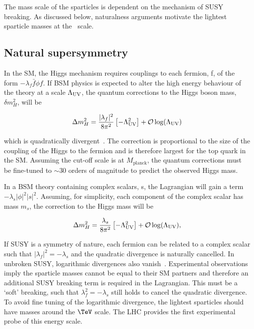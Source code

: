 The mass scale of the sparticles is dependent on the mechanism of SUSY breaking.
As discussed below, naturalness arguments motivate the lightest sparticle masses 
at the \TeV~scale.

\subsection{Natural supersymmetry}
\label{sec:natSUSY}
In the SM, the Higgs mechanism requires couplings to each fermion, f, of the form $-\lambda_{f}\bar{f}\phi f$. If BSM physics
is expected to alter the high energy behaviour of the theory at a scale $\Lambda_{\mathrm{UV}}$, the quantum corrections 
to the Higgs boson mass, $\delta m^2_{H}$, will be 

\begin{equation}
\Delta m^2_H =  \frac{|\lambda_f|^2}{8\pi^2}\left[-\Lambda^2_{\text{UV}}\right] + \mathcal{O}\log(\Lambda_{\mathrm{UV}})
\end{equation}

which is quadratically divergent~\cite{HMSSM}. The correction is proportional to the size of the coupling of the Higgs to the fermion 
and is therefore largest for the top quark in the SM. Assuming the cut-off scale is at $M_{\text{planck}}$, the quantum 
corrections must be fine-tuned to $\sim 30$ orders of magnitude to predict the observed Higgs mass. 

In a BSM theory containing complex scalars, s, the Lagrangian will gain a term $-\lambda_{s}|\phi|^2|s|^2$.
Assuming, for simplicity, each component of the complex scalar has mass $m_s$, the correction to the Higgs mass will be

\begin{equation}
\label{equ:corrHiggsSusy}
\Delta m^2_H =  \frac{\lambda_s}{8\pi^2}\left[-\Lambda^2_{\text{UV}}\right] + \mathcal{O}\log(\Lambda_{\mathrm{UV}}),
\end{equation}

If SUSY is a symmetry of nature, each fermion can be related to a complex scalar such that $|\lambda_f|^2 = -\lambda_s$ 
and the quadratic divergence is naturally cancelled. In unbroken SUSY, logarithmic divergences also vanish~\cite{HMSSM}. 
Experimental observations imply the sparticle masses cannot be equal to their SM partners and
therefore an additional SUSY breaking term is required in the Lagrangian. This must be a `soft' breaking,
such that $\lambda_f^2 = -\lambda_s$ still holds to cancel the quadratic divergence.
To avoid fine tuning of the logarithmic divergence, the lightest sparticles should have 
masses around the $\TeV$ scale. The LHC provides the first experimental probe of this energy scale.

